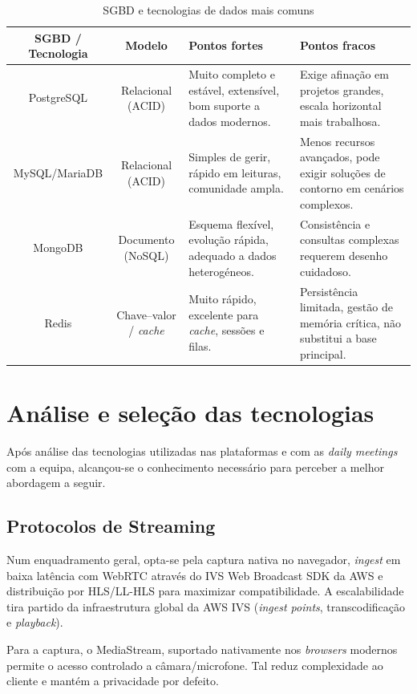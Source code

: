 \begin{table}[H]
\caption{SGBD e tecnologias de dados mais comuns}
\label{tab:db-comparativa}
\begin{center}
\small
\begin{tabular}{|c|c|p{3cm}|p{3cm}|}
\hline
\textbf{SGBD / Tecnologia} & \textbf{Modelo} & \textbf{Pontos fortes} & \textbf{Pontos fracos} \\ \hline
PostgreSQL & Relacional (ACID) & Muito completo e estável, extensível, bom suporte a dados modernos. & Exige afinação em projetos grandes, escala horizontal mais trabalhosa. \\ \hline
MySQL/MariaDB & Relacional (ACID) & Simples de gerir, rápido em leituras, comunidade ampla. & Menos recursos avançados, pode exigir soluções de contorno em cenários complexos. \\ \hline
MongoDB & Documento (NoSQL) & Esquema flexível, evolução rápida, adequado a dados heterogéneos. & Consistência e consultas complexas requerem desenho cuidadoso. \\ \hline
Redis & Chave–valor / \textit{cache} & Muito rápido, excelente para \textit{cache}, sessões e filas. & Persistência limitada, gestão de memória crítica, não substitui a base principal. \\ \hline
\end{tabular}
\end{center}
\end{table}

\section{Análise e seleção das tecnologias}
\label{sec:Req} 
Após análise das tecnologias utilizadas nas plataformas e com as \textit{daily meetings} com a equipa, alcançou-se o conhecimento necessário para perceber a melhor abordagem a seguir.

\subsection{Protocolos de Streaming}

Num enquadramento geral, opta-se pela captura nativa no navegador, \textit{ingest} em baixa latência com WebRTC através do \gls{IVS} Web Broadcast SDK da AWS e distribuição por HLS/LL-HLS para maximizar compatibilidade. A escalabilidade tira partido da infraestrutura  global da AWS IVS (\textit{ingest points}, transcodificação e \textit{playback}).

Para a captura, o MediaStream, suportado nativamente nos \textit{browsers} modernos permite o acesso controlado a câmara/microfone. Tal reduz complexidade ao cliente e mantém a privacidade por defeito.

